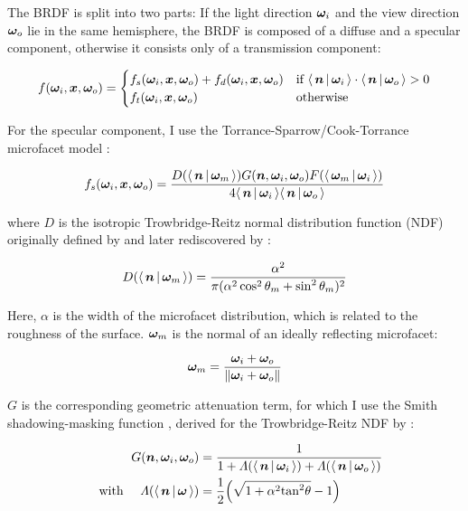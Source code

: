 The BRDF is split into two parts: If the light direction $\bm{\omega}_i$ and the view direction $\bm{\omega}_o$ lie in the same hemisphere, the BRDF is composed of a diffuse and a specular component, otherwise it consists only of a transmission component:

\begin{equation}
    f(\wi, \vec{x}, \wo) =
    \begin{cases}
        f_s(\wi, \vec{x}, \wo) + f_d(\wi, \vec{x}, \wo) & \text{if } \NdotL \cdot \NdotV > 0 \\
        f_t(\wi, \vec{x}, \wo) & \text{otherwise}
    \end{cases}
\end{equation}

For the specular component, I use the Torrance-Sparrow/Cook-Torrance microfacet model :

\begin{equation}
    f_s(\wi, \vec{x}, \wo) = \frac{D(\NdotH) G(\n, \wi, \wo) F(\LdotH)}{4 \NdotL \NdotV}
\end{equation}

where $D$ is the isotropic Trowbridge-Reitz normal distribution function (NDF) originally defined by \textcite{trowbridge1975} and later rediscovered by \textcite{walter2007}:

\begin{equation}
    D(\NdotH) = \frac{\alpha^2}{\pi (\alpha^2 \cos^2 \theta_m + \sin^2 \theta_m)^2}
\end{equation}

Here, $\alpha$ is the width of the microfacet distribution, which is related to the roughness of the surface.
$\bm{\omega}_m$ is the normal of an ideally reflecting microfacet:

\begin{equation}
    \bm{\omega}_m = \frac{\bm{\omega}_i + \bm{\omega}_o}{\|\bm{\omega}_i + \bm{\omega}_o\|}
\end{equation}

$G$ is the corresponding geometric attenuation term, for which I use the Smith shadowing-masking function , derived for the Trowbridge-Reitz NDF by \textcite{walter2007}:

\begin{equation}
    \begin{aligned}
    G(\n, \wi, \wo) &= \frac{1}{1 + \Lambda(\NdotL) + \Lambda(\NdotV)}\\
    \quad \text{with } \quad
    \Lambda(\NdotX) &= \frac{1}{2} \left( \sqrt{1 + \alpha^2 \mathrm{tan}^2 \theta} - 1 \right)
    \end{aligned}
\end{equation}


